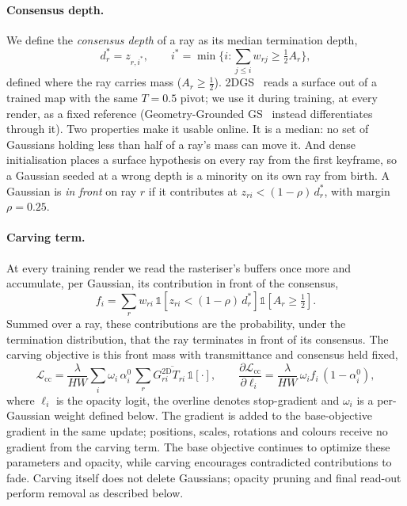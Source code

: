 \paragraph{Consensus depth.}
We define the \emph{consensus depth} of a ray as its median termination depth,
\begin{equation}\label{eq:consensus_depth}
  d^*_r=z_{r,i^*},\qquad i^*=\min\Big\{i:\textstyle\sum_{j\le i}w_{rj}\ge\tfrac12A_r\Big\},
\end{equation}
defined where the ray carries mass ($A_r\ge\tfrac12$). 2DGS~\cite{2dgs} reads a surface out of a trained map with the same $T{=}0.5$
pivot; we use it during training, at every render, as a fixed reference (Geometry-Grounded GS~\cite{gggs} instead differentiates through
it). Two properties make it usable online. It is a median: no set of Gaussians holding less than half of a ray's mass can move it. And
dense initialisation places a surface hypothesis on every ray from the first keyframe, so a Gaussian seeded at a wrong depth is a
minority on its own ray from birth. A Gaussian is \emph{in front} on ray $r$ if it contributes at $z_{ri}<(1-\rho)\,d^*_r$, with margin
$\rho=0.25$.

\paragraph{Carving term.}
At every training render we read the rasteriser's buffers once more and accumulate, per Gaussian, its contribution in front of the
consensus,
\begin{equation}\label{eq:front_mass}
  f_i=\sum_{r}w_{ri}\,\mathbb{1}\!\left[z_{ri}<(1-\rho)\,d^*_r\right]\mathbb{1}\!\left[A_r\ge\tfrac12\right].
\end{equation}
Summed over a ray, these contributions are the probability, under the termination distribution, that the ray terminates in front of
its consensus. The carving objective is this front mass with transmittance and consensus held fixed,
\begin{equation}\label{eq:consensus_carve}
  \mathcal L_{\mathrm{cc}}
  =\frac{\lambda}{HW}\sum_i \omega_i\,\alpha_i^0\,\overline{\textstyle\sum_r G_{ri}^{\mathrm{2D}}T_{ri}\,\mathbb{1}[\cdot]},
  \qquad
  \frac{\partial\mathcal L_{\mathrm{cc}}}{\partial\ell_i}=\frac{\lambda}{HW}\,\omega_i f_i\,(1-\alpha_i^0),
\end{equation}
where $\ell_i$ is the opacity logit, the overline denotes stop-gradient and $\omega_i$ is a per-Gaussian weight defined below.
The gradient is added to the base-objective gradient in the same update; positions, scales, rotations and colours receive no gradient from the carving term.
The base objective continues to optimize these parameters and opacity, while carving encourages contradicted contributions to fade.
Carving itself does not delete Gaussians; opacity pruning and final read-out perform removal as described below.

